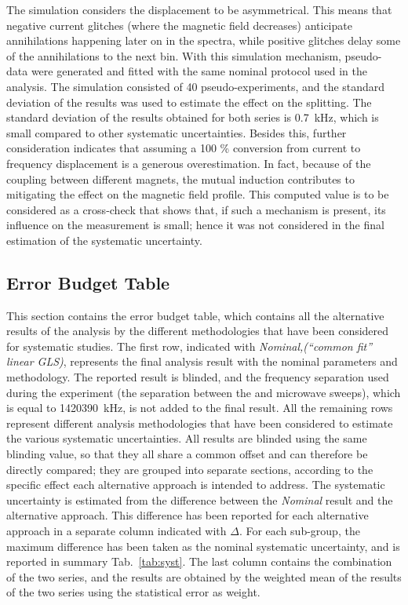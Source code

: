 The simulation considers the displacement to be asymmetrical. This means that negative current glitches (where the magnetic field decreases) anticipate annihilations happening later on in the spectra, while positive glitches delay some of the annihilations to the next bin. With this simulation mechanism, pseudo-data were generated and fitted with the same nominal protocol used in the analysis. The simulation consisted of 40 pseudo-experiments, and the standard deviation of the results was used to estimate the effect on the splitting. The standard deviation of the results obtained for both series is \SI{0.7}{\kilo \hertz}, which is small compared to other systematic uncertainties. Besides this, further consideration indicates that assuming a 100 \% conversion from current to frequency displacement is a generous overestimation. In fact, because of the coupling between different magnets, the mutual induction contributes to mitigating the effect on the magnetic field profile. This computed value is to be considered as a cross-check that shows that, if such a mechanism is present, its influence on the measurement is small; hence it was not considered in the final estimation of the systematic uncertainty.

\subsection{Error Budget Table} \label{sec:ErrorBudgetSec}

This section contains the error budget table, which contains all the alternative results of the analysis by the different methodologies that have been considered for systematic studies. The first row, indicated with \textit{Nominal,(``common fit'' linear GLS)}, represents the final analysis result with the nominal parameters and methodology. The reported result is blinded, and the frequency separation used during the experiment (the separation between the \cb and \da microwave sweeps), which is equal to \SI{1420390}{\kilo \hertz}, is not added to the final result. All the remaining rows represent different analysis methodologies that have been considered to estimate the various systematic uncertainties. All results are blinded using the same blinding value, so that they all share a common offset and can therefore be directly compared; they are grouped into separate sections, according to the specific effect each alternative approach is intended to address. The systematic uncertainty is estimated from the difference between the \textit{Nominal} result and the alternative approach. This difference has been reported for each alternative approach in a separate column indicated with \textbf{$\Delta$}. For each sub-group, the maximum difference has been taken as the nominal systematic uncertainty, and is reported in summary Tab.~\ref{tab:syst}. The last column contains the combination of the two series, and the results are obtained by the weighted mean of the results of the two series using the statistical error as weight.

